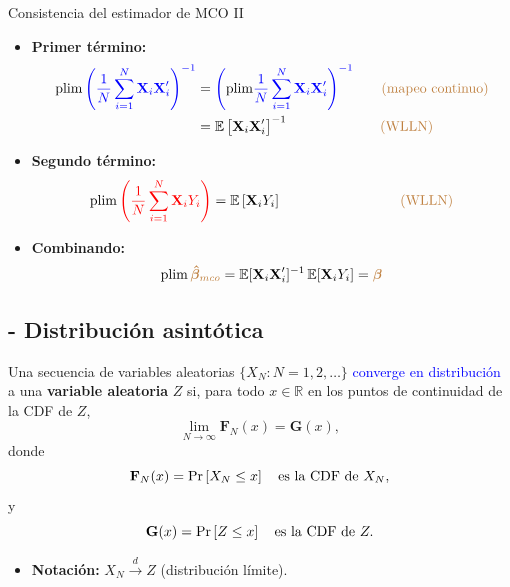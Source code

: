 \documentclass[10pt, xcolor=dvipsnames]{beamer}
\begin{document}
\begin{frame}{Consistencia del estimador de MCO II}
\begin{itemize}
    \item \textbf{Primer término:} 
    \begin{align*}
    \begin{split}
        \plim \textcolor{blue}{\left(\frac{1}{N}\sum_{i=1}^{N}\XB_i \XB'_i \right)^{-1}} &= \textcolor{blue}{\left(\textcolor{black}{\plim} \frac{1}{N}\sum_{i=1}^{N}\XB_i \XB'_i \right)^{-1}} \quad \quad \text{\color{brown} (mapeo continuo)} \\ &= \EX\left[\XB_i \XB'_i\right]^{-1} \hspace{2.3cm} \text{\color{brown} (WLLN)} 
    \end{split}
    \end{align*}
    \item \textbf{Segundo término:}    
    \begin{align*}
    \begin{split}
        \plim \textcolor{red}{\left(\frac{1}{N}\sum_{i=1}^{N}\XB_i Y_i \right)} = \EX\left[\XB_i Y_i\right] \hspace{3cm} \text{\color{brown} (WLLN)}
    \end{split}
    \end{align*}
    \item \textbf{Combinando:}
    \begin{align*}
        \plim \brown{\betaBH_{mco}} = \EX[\XB_i\XB'_i]^{-1} \EX[\XB_iY_i] = \textcolor{brown}{\betaB} 
    \end{align*}
\end{itemize}
\end{frame}

\subsection{- Distribución asintótica}

\begin{frame}[plain]
\begin{tcolorbox}[colback=white, arc=0mm,boxrule=0.5pt, title=Definición: Convergencia en distribución, breakable]
    Una secuencia de variables aleatorias 
    \(\{X_N : N=1,2,\ldots\}\) 
    \textcolor{blue}{converge en distribución} a una \textbf{variable aleatoria} \(Z\) si, para todo \(x \in \mathbb{R}\) en los puntos de continuidad de la CDF de \(Z\),
    \[
        \lim_{N \to \infty} \textbf{F}_N(x) = \textbf{G}(x),
    \]
    donde 
    \[
        \textbf{F}_N(x) = \text{Pr}\left[X_N \leq x\right] \quad \text{es la CDF de } X_N,
    \]
    y 
    \[
        \textbf{G}(x) = \text{Pr}\left[Z \leq x\right] \quad \text{es la CDF de } Z.
    \]
\end{tcolorbox}
\begin{itemize}
    \item \textbf{Notación:} $X_N \xrightarrow{d} Z$ (distribución límite).	
\end{itemize}
\end{frame}
\end{document}
